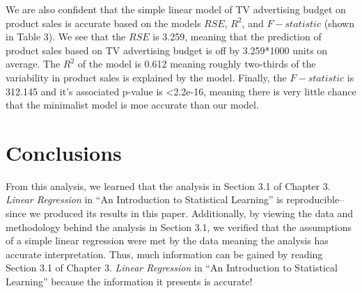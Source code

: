 \documentclass[12pt]{article}\usepackage[]{graphicx}\usepackage[]{color}
\begin{document}
We are also confident that the simple linear model of TV advertising budget on product sales is accurate based on the models $RSE$, $R^2$, and $F-statistic$ (shown in Table 3). We see that the $RSE$ is 3.259, meaning that the prediction of product sales based on TV advertising budget is off by 3.259*1000 units on average. The $R^2$ of the model is 0.612 meaning roughly two-thirds of the variability in product sales is explained by the model. Finally, the $F-statistic$ is 312.145 and it's associated p-value is <2.2e-16, meaning there is very little chance that the minimalist model is moe accurate than our model.

\section{Conclusions}

From this analysis, we learned that the analysis in Section 3.1 of Chapter 3. \textit{Linear Regression} in ``An Introduction to Statistical Learning'' is reproducible--since we produced its results in this paper. Additionally, by viewing the data and methodology behind the analysis in Section 3.1, we verified that the assumptions of a simple linear regression were met by the data meaning the analysis has accurate interpretation. Thus, much information can be gained by reading Section 3.1 of Chapter 3. \textit{Linear Regression} in ``An Introduction to Statistical Learning'' because the information it presents is accurate!
\end{document}
